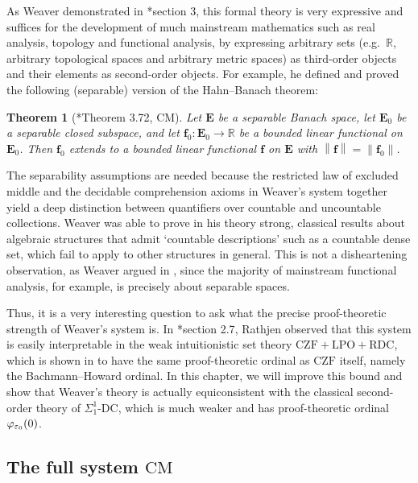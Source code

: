 \documentclass[12pt,openany]{book}
\theoremstyle{plain}
\newtheorem{theorem}{Theorem}[section]
\theoremstyle{definition}
\newcommand\DC{\text{-}\mathrm{DC}}
\newcommand\CZF{\mathrm{CZF}}
\newcommand\LPO{\mathrm{LPO}}
\newcommand\RDC{\mathrm{RDC}}
\newcommand\CM{\mathrm{CM}}
\begin{document}
As Weaver demonstrated in \cite{weaver09-cm}*{section 3}, this formal theory is very expressive and suffices for the development of much mainstream mathematics such as real analysis, topology and functional analysis, by expressing arbitrary sets (e.g.\ $\mathbb{R}$, arbitrary topological spaces and arbitrary metric spaces) as third-order objects and their elements as second-order objects. For example, he defined and proved the following (separable) version of the Hahn--Banach theorem:

\begin{theorem}[\cite{weaver09-cm}*{Theorem 3.72}, $\CM$]
  \label{thm:cm-hahn-banach}
  Let $\mathbf{E}$ be a separable Banach space, let $\mathbf{E}_0$ be a separable closed
  subspace, and let $\mathbf{f}_0 : \mathbf{E}_0 \to \mathbb{R}$ be a bounded linear functional on $\mathbf{E}_0$. Then $\mathbf{f}_0$
  extends to a bounded linear functional $\mathbf{f}$ on $\mathbf{E}$ with $\left\|\mathbf{f}\right\| = \left\|\mathbf{f}_0\right\|$.
\end{theorem}

The separability assumptions are needed because the restricted law of excluded middle and the decidable comprehension axioms in Weaver's system together yield a deep distinction between quantifiers over countable and uncountable collections. Weaver was able to prove in his theory strong, classical results about algebraic structures that admit `countable descriptions' such as a countable dense set, which fail to apply to other structures in general. This is not a disheartening observation, as Weaver argued in \cite{weaver09-set-theory-indispensable}, since the majority of mainstream functional analysis, for example, is precisely about separable spaces.

Thus, it is a very interesting question to ask what the precise proof-theoretic strength of Weaver's system is. In \cite{rathjen23-cst}*{section 2.7}, Rathjen observed that this system is easily interpretable in the weak intuitionistic set theory $\CZF + \LPO + \RDC$, which is shown in \cite{rathjen14-czf-lpo} to have the same proof-theoretic ordinal as $\CZF$ itself, namely the Bachmann--Howard ordinal. In this chapter, we will improve this bound and show that Weaver's theory is actually equiconsistent with the classical second-order theory of $\Sigma^1_1\DC$, which is much weaker and has proof-theoretic ordinal $\varphi_{\varepsilon_0}\mleft(0\mright)$.

\subsection*{The full system $\CM$}
\end{document}
